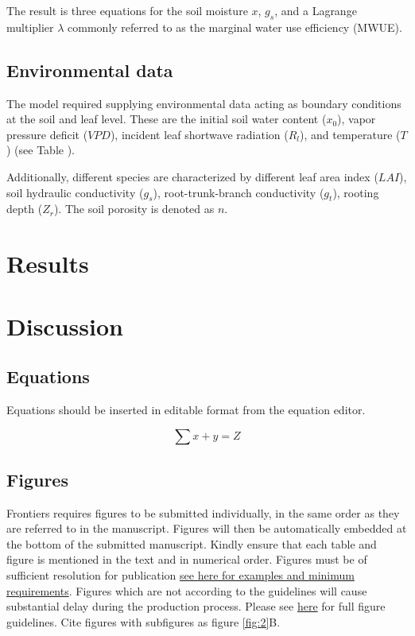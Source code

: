 \documentclass[utf8]{frontiersSCNS} %
\begin{document}
The result is three equations for the soil moisture $x$, $g_s$, and a Lagrange multiplier $\lambda$ commonly referred to as the marginal water use efficiency (MWUE). 

\subsection{Environmental data}

The model required supplying environmental data acting as boundary conditions at the soil and leaf level. These are the initial soil water content ($x_0$), vapor pressure deficit ($VPD$), incident leaf shortwave radiation ($R_l$), and temperature ($T$) (see Table ).

Additionally, different species are characterized by different leaf area index ($LAI$), soil hydraulic conductivity ($g_s$), root-trunk-branch conductivity ($g_t$), rooting depth ($Z_r$). The soil porosity is denoted as $n$.

\section{Results}


\section{Discussion}

\subsection{Equations}
Equations should be inserted in editable format from the equation editor.

\begin{equation}
\sum x+ y =Z\label{eq:01}
\end{equation}

\subsection{Figures}
Frontiers requires figures to be submitted individually, in the same order as they are referred to in the manuscript. Figures will then be automatically embedded at the bottom of the submitted manuscript. Kindly ensure that each table and figure is mentioned in the text and in numerical order. Figures must be of sufficient resolution for publication \href{http://home.frontiersin.org/about/author-guidelines#ResolutionRequirements}{see here for examples and minimum requirements}. Figures which are not according to the guidelines will cause substantial delay during the production process. Please see \href{http://home.frontiersin.org/about/author-guidelines#GeneralStyleGuidelinesforFigures}{here} for full figure guidelines. Cite figures with subfigures as figure \ref{fig:2}B.
\end{document}
